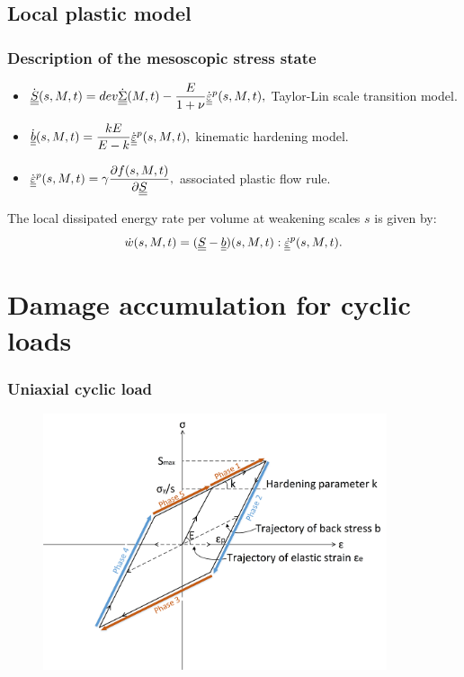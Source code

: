 \documentclass[xcolor=table]{Bredelebeamer}
\begin{document}
\subsection{Local plastic model}
\begin{frame}
	\frametitle{Description of the mesoscopic stress state}	

\begin{itemize}
	\item $\dot{\uline{\uline{S}}}(s,M,t)=dev\dot{\uline{\uline{\Sigma}}}(M,t)-\dfrac{E}{1+\nu}\dot{\uline{\uline{\varepsilon}}}^p(s,M,t),$ Taylor-Lin scale transition model.

	\vspace{6pt}	
	\item
	$\dot{\uline{\uline{b}}}(s,M,t)=\dfrac{kE}{E-k} \dot{\uline{\uline{\varepsilon}}}^p(s,M,t),$  kinematic hardening model.

	\vspace{6pt}	
		\item
		$\dot{\uline{\uline{\varepsilon}}}^p(s,M,t)=\gamma\dfrac{\partial f(s,M,t)}{\partial \uline{\uline{S}}}, $ associated plastic flow rule.
\end{itemize}

	\vspace{6pt}
The local dissipated energy rate per volume at weakening scales $s$  is given by:
$$\dot{w}(s,M,t)=(\uline{\uline{S}}-\uline{\uline{b}})(s,M,t):\uline{\uline{\dot{\varepsilon}}}^p(s,M,t).$$ 
\end{frame}

\section{Damage accumulation for cyclic loads}
\begin{frame}
	\frametitle{Uniaxial cyclic load}	
	\begin{figure}[h!]
		\centering
		\includegraphics[width=0.9\textwidth]{figures//backstress.png} 
		\label{backstress}
	\end{figure}
\end{frame}	
\end{document}
